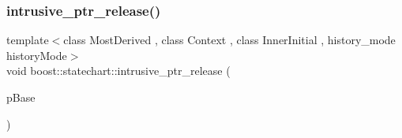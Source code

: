 \subsubsection{\texorpdfstring{intrusive\+\_\+ptr\+\_\+release()}{intrusive\_ptr\_release()}\hspace{0.1cm}{\footnotesize\ttfamily [2/2]}}
{\footnotesize\ttfamily template$<$class Most\+Derived , class Context , class Inner\+Initial , history\+\_\+mode history\+Mode$>$ \\
void boost\+::statechart\+::intrusive\+\_\+ptr\+\_\+release (\begin{DoxyParamCaption}\item[{const \+::\mbox{\hyperlink{classboost_1_1statechart_1_1simple__state}{boost\+::statechart\+::simple\+\_\+state}}$<$ Most\+Derived, Context, Inner\+Initial, history\+Mode $>$ $\ast$}]{p\+Base }\end{DoxyParamCaption})\hspace{0.3cm}{\ttfamily [inline]}}

